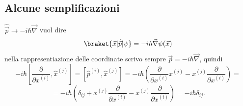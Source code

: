 \subsection{Alcune semplificazioni}
\( \hat{\vec{p}} \to -i\hbar\vec{\nabla} \) vuol dire
\[
\braket{\vec{x}|\hat{\vec{p}}|\psi} = -i\hbar\vec{\nabla}\psi(\vec{x})
\]
nella rappresentiazione delle coordinate scrivo sempre \( \vec{p} = -i\hbar \vec{\nabla} \), quindi
\[
-i\hbar\left[ \frac{\partial}{\partial x^{(i)}}, \hat{x}^{(j)} \right] = [\hat{p}^{(i)}, \hat{x}^{(j)}] = -i\hbar \left( \frac{\partial}{\partial x^{(i)}} x^{(j)} - x^{(j)} \frac{\partial}{\partial x^{(i)}} \right) =
\]
\[
= -i\hbar\left( \delta_{ij} + x^{(j)} \frac{\partial}{\partial x^{(i)}} - x^{(j)} \frac{\partial}{\partial x^{(i)}} \right) = -i\hbar\delta_{ij}.
\]